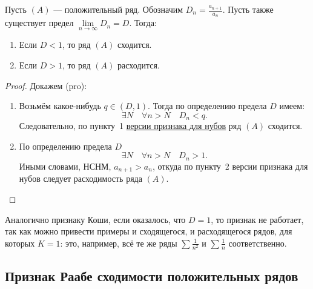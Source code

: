 \begin{theorem}[pro]
	Пусть \((A)\) --- положительный ряд. Обозначим \linebreak \(D_n = \frac{a_{n+1}}{a_n}\). Пусть также существует предел \(\lim\limits_{n \to \infty} D_n = D\). Тогда:
	\begin{enumerate}
		\item Если \(D < 1\), то ряд \((A)\) сходится.
		\item Если \(D > 1\), то ряд \((A)\) расходится.
	\end{enumerate}
\end{theorem}
\begin{proof}
	Докажем (pro):
	\begin{enumerate}
		\item Возьмём какое-нибудь \(q \in (D, 1)\). Тогда по определению предела \(D\) имеем: \[
		\exists N \quad \forall n > N \quad D_n < q.
		\]
		Следовательно, по пункту~1 \hyperlink{Даламбер-нуб}{версии признака для нубов} ряд \((A)\) сходится.
		\item По определению предела  \(D\) \[
		\exists N \quad \forall n > N \quad D_n > 1.
		\]
		Иными словами, НСНМ,  \(a_{n+1} > a_n\), откуда по пункту~2 версии признака для нубов следует расходимость ряда \((A)\).
	\end{enumerate}
\end{proof}

\begin{remark}
	Аналогично признаку Коши, если оказалось, что \(D = 1\), то признак не работает, так как можно привести примеры и сходящегося, и расходящегося рядов, для которых \(K = 1\): это, например, всё те же ряды \(\sum \frac{1}{n^2}\) и \(\sum \frac{1}{n}\) соответственно.
\end{remark}

\subsection{Признак Раабе сходимости положительных рядов}


